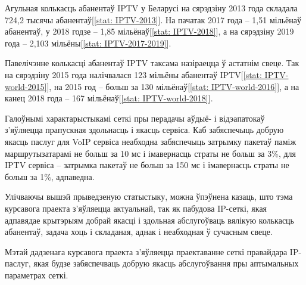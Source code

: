 Агульная колькасць абанентаў IPTV у Беларусі на сярэдзіну 2013 года
складала 724,2 тысячы абанентаў[\ref{stat: IPTV-2013}].
На пачатак 2017 года -- 1,51 мільёнаў абанентаў,
у 2018 годзе -- 1,85 мільёнаў[\ref{stat: IPTV-2018}],
а на сярэдзіну 2019 года -- 2,103 мільёны[\ref{stat: IPTV-2017-2019}].

Павелічэнне колькасці абанентаў IPTV таксама назіраецца
ў астатнім свеце. Так на сярэдзіну 2015 года налічвалася
123 мільёны абанентаў IPTV[\ref{stat: IPTV-world-2015}],
на 2015 год -- больш за 130 мільёнаў[\ref{stat: IPTV-world-2016}],
а на канец 2018 года -- 167 мільёнаў[\ref{stat: IPTV-world-2018}].

Галоўнымі характарыстыкамі сеткі пры перадачы аўдыё- і відэапатокаў
з'яўляецца прапускная здольнасць і якасць сервіса.
Каб забяспечыць добрую якасць паслуг для VoIP сервіса
неабходна забяспечыць затрымку пакетаў паміж маршрутызатарамі не больш за
10 мс і імавернасць страты не больш за 3\%, для IPTV сервіса --
затрымка пакетаў не больш за 150 мс і імавернасць страты не больш за 1\%,
адпаведна.

Улічваючы вышэй прыведзеную статыстыку, можна ўпэўнена казаць, што
тэма курсавога праекта з'яўляецца актуальнай, так як
пабудова IP-сеткі, якая адпавядае крытэрыям добрай якасці і здольная
абслугоўваць вялікую колькасць абанентаў, задача хоць і складаная,
аднак і неабходная ў сучасным свеце.

Мэтай дадзенага курсавога праекта з'яўляецца праектаванне сеткі правайдара
IP-паслуг, якая будзе забяспечваць добрую якасць абслугоўвання пры
аптымальных параметрах сеткі.
